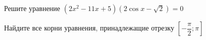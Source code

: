 \begin{ex}
	\begin{condition}
		\begin{enumcols}[label=\asbuk*)]
			\item Решите уравнение \( (2x^2 - 11x +5)(2\cos x -\sqrt{2}) = 0 \)
			\item Найдите все корни уравнения, принадлежащие отрезку \( \left[-\dfrac{\pi}{2};\pi\right] \)
		\end{enumcols}
	\end{condition}
\end{ex}